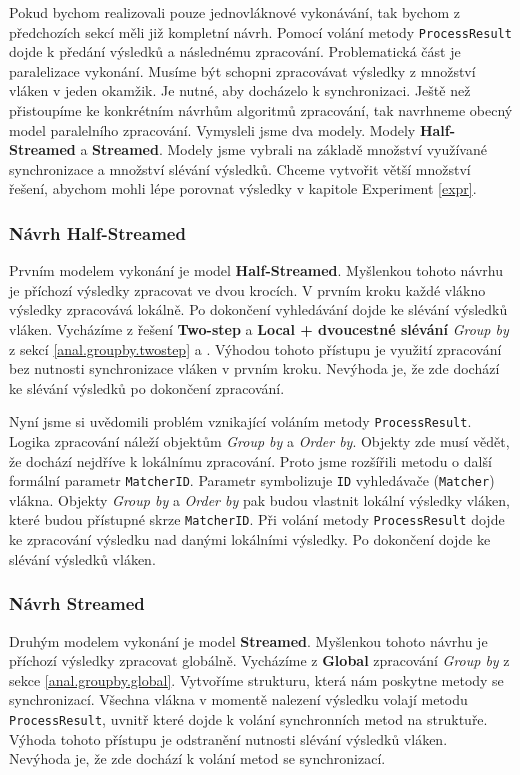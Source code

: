 Pokud bychom realizovali pouze jednovláknové vykonávání, tak bychom z předchozích sekcí měli již kompletní návrh.
Pomocí volání metody \texttt{ProcessResult} dojde k předání výsledků a následnému zpracování.
Problematická část je paralelizace vykonání.
Musíme být schopni zpracovávat výsledky z množství vláken v jeden okamžik.
Je nutné, aby docházelo k synchronizaci.
Ještě než přistoupíme ke konkrétním návrhům algoritmů zpracování, tak navrhneme obecný model paralelního zpracování.
Vymysleli jsme dva modely.
Modely \textbf{Half-Streamed} a \textbf{Streamed}.
Modely jsme vybrali na základě množství využívané synchronizace a množství slévání výsledků.
Chceme vytvořit větší množství řešení, abychom mohli lépe porovnat výsledky v kapitole Experiment \ref{expr}.

\subsubsection{Návrh Half-Streamed}

Prvním modelem vykonání je model \textbf{Half-Streamed}.
Myšlenkou tohoto návrhu je příchozí výsledky zpracovat ve dvou krocích.
V prvním kroku každé vlákno výsledky zpracovává lokálně.
Po dokončení vyhledávání dojde ke slévání výsledků vláken.
Vycházíme z řešení \textbf{Two-step} a \textbf{Local + dvoucestné slévání} \textit{Group by} z sekcí \ref{anal.groupby.twostep} a \label{anal.groupby.local}.
Výhodou tohoto přístupu je využití zpracování bez nutnosti synchronizace vláken v prvním kroku.
Nevýhoda je, že zde dochází ke slévání výsledků po dokončení zpracování.

Nyní jsme si uvědomili problém vznikající voláním metody \texttt{ProcessResult}.
Logika zpracování náleží objektům \textit{Group by} a \textit{Order by}.
Objekty zde musí vědět, že dochází nejdříve k lokálnímu zpracování.
Proto jsme rozšířili metodu o další formální parametr \texttt{MatcherID}.
Parametr symbolizuje \texttt{ID} vyhledávače (\texttt{Matcher}) vlákna.
Objekty \textit{Group by} a \textit{Order by} pak budou vlastnit lokální výsledky vláken, které budou přístupné skrze \texttt{MatcherID}.
Při volání metody \texttt{ProcessResult} dojde ke zpracování výsledku nad danými lokálními výsledky.
Po dokončení dojde ke slévání výsledků vláken.

\subsubsection{Návrh Streamed}

Druhým modelem vykonání je model \textbf{Streamed}.
Myšlenkou tohoto návrhu je příchozí výsledky zpracovat globálně.
Vycházíme z \textbf{Global} zpracování \textit{Group by} z sekce \ref{anal.groupby.global}.
Vytvoříme strukturu, která nám poskytne metody se synchronizací.
Všechna vlákna v momentě nalezení výsledku volají metodu \texttt{ProcessResult}, uvnitř které dojde k volání synchronních metod na struktuře.
Výhoda tohoto přístupu je odstranění nutnosti slévání výsledků vláken.
Nevýhoda je, že zde dochází k volání metod se synchronizací.

